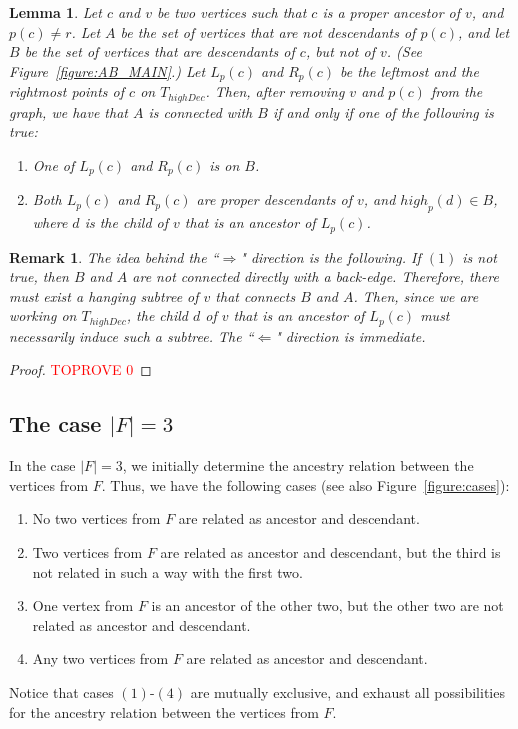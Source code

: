 \documentclass[11pt,a4paper]{article}
\newtheorem{lemma}[theorem]{Lemma}
\newtheorem{remark}[theorem]{Remark}
\begin{document}
\begin{lemma}
\label{lemma:lbelowwonT_high_MAIN}
Let $c$ and $v$ be two vertices such that $c$ is a proper ancestor of $v$, and $p(c)\neq r$. Let $A$ be the set of vertices that are not descendants of $p(c)$, and let $B$ be the set of vertices that are descendants of $c$, but not of $v$. (See Figure~\ref{figure:AB_MAIN}.) Let $L_p(c)$ and $R_p(c)$ be the leftmost and the rightmost points of $c$ on $T_\mathit{highDec}$. Then, after removing $v$ and $p(c)$ from the graph, we have that $A$ is connected with $B$ if and only if one of the following is true:
\begin{enumerate}[label={(\arabic*)}]
\item{One of $L_p(c)$ and $R_p(c)$ is on $B$.}
\item{Both  $L_p(c)$ and $R_p(c)$ are proper descendants of $v$, and $\mathit{high}_p(d)\in B$, where $d$ is the child of $v$ that is an ancestor of $L_p(c)$.}
\end{enumerate} 
\end{lemma}
\begin{remark}
\normalfont
The idea behind the ``$\Rightarrow$" direction is the following. If $(1)$ is not true, then $B$ and $A$ are not connected directly with a back-edge. Therefore, there must exist a hanging subtree of $v$ that connects $B$ and $A$. Then, since we are working on $T_\mathit{highDec}$, the child $d$ of $v$ that is an ancestor of $L_p(c)$ must necessarily induce such a subtree. The ``$\Leftarrow$" direction is immediate. 
\end{remark}

\begin{proof}\textcolor{red}{TOPROVE 0}\end{proof}


\subsection{The case $|F|=3$}
\label{section:f=3}

In the case $|F|=3$, we initially determine the ancestry relation between the vertices from $F$. Thus, we have the following cases (see also Figure~\ref{figure:cases}):

\begin{enumerate}[label={(\arabic*)}] 
\item{No two vertices from $F$ are related as ancestor and descendant.}
\item{Two vertices from $F$ are related as ancestor and descendant, but the third is not related in such a way with the first two.}
\item{One vertex from $F$ is an ancestor of the other two, but the other two are not related as ancestor and descendant.}
\item{Any two vertices from $F$ are related as ancestor and descendant.}
\end{enumerate}
Notice that cases $(1)$-$(4)$ are mutually exclusive, and exhaust all possibilities for the ancestry relation between the vertices from $F$. 
\end{document}
